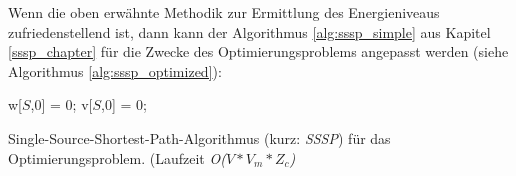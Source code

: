 \documentclass[12pt]{article}
\begin{document}
Wenn die oben erwähnte Methodik zur Ermittlung des Energieniveaus zufriedenstellend ist, dann kann der Algorithmus \ref{alg:sssp_simple} aus Kapitel \ref{sssp_chapter} für die Zwecke des Optimierungsproblems angepasst werden (siehe Algorithmus \ref{alg:sssp_optimized}):

\begin{algorithm}[ht]
w[$S$,0] = 0;
v[$S$,0] = 0;
\caption{Single-Source-Shortest-Path-Algorithmus (kurz: \textit{SSSP}) für das Optimierungsproblem. (Laufzeit \textit{O($V*V_m*Z_c$)}}
\label{alg:sssp_optimized}
\end{algorithm}
\end{document}
